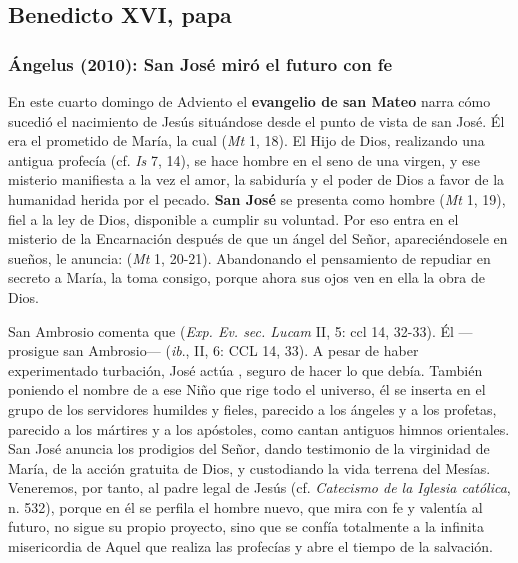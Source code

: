 \newsection

		\subsection{Benedicto XVI, papa}

			\subsubsection{Ángelus (2010): San José miró el futuro con fe}

				
				\begin{body}
					En este cuarto domingo de Adviento el \textbf{evangelio de san Mateo} narra cómo sucedió el nacimiento de Jesús situándose desde el punto de vista de san José. Él era el prometido de María, la cual  (\emph{Mt} 1, 18). El Hijo de Dios, realizando una antigua profecía (cf. \emph{Is} 7, 14), se hace hombre en el seno de una virgen, y ese misterio manifiesta a la vez el amor, la sabiduría y el poder de Dios a favor de la humanidad herida por el pecado. \textbf{San José} se presenta como hombre  (\emph{Mt} 1, 19), fiel a la ley de Dios, disponible a cumplir su voluntad. Por eso entra en el misterio de la Encarnación después de que un ángel del Señor, apareciéndosele en sueños, le anuncia:  (\emph{Mt} 1, 20-21). Abandonando el pensamiento de repudiar en secreto a María, la toma consigo, porque ahora sus ojos ven en ella la obra de Dios.
					
					San Ambrosio comenta que  (\emph{Exp. Ev. sec. Lucam} II, 5: ccl 14, 32-33). Él ---prosigue san Ambrosio---  (\emph{ib}., II, 6: CCL 14, 33). A pesar de haber experimentado turbación, José actúa , seguro de hacer lo que debía. También poniendo el nombre de  a ese Niño que rige todo el universo, él se inserta en el grupo de los servidores humildes y fieles, parecido a los ángeles y a los profetas, parecido a los mártires y a los apóstoles, como cantan antiguos himnos orientales. San José anuncia los prodigios del Señor, dando testimonio de la virginidad de María, de la acción gratuita de Dios, y custodiando la vida terrena del Mesías. Veneremos, por tanto, al padre legal de Jesús (cf. \emph{Catecismo de la Iglesia católica}, n. 532), porque en él se perfila el hombre nuevo, que mira con fe y valentía al futuro, no sigue su propio proyecto, sino que se confía totalmente a la infinita misericordia de Aquel que realiza las profecías y abre el tiempo de la salvación.
					

\end{body}
